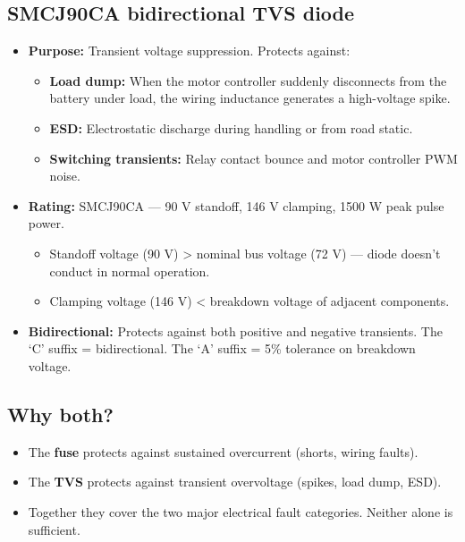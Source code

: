\documentclass[12pt,a4paper,oneside]{report}
\providecommand{\tightlist}{\setlength{\itemsep}{0pt}\setlength{\parskip}{0pt}}
\begin{document}
\subsection{SMCJ90CA bidirectional TVS
diode}\label{smcj90ca-bidirectional-tvs-diode}

\begin{itemize}
\tightlist
\item
  \textbf{Purpose:} Transient voltage suppression. Protects against:

  \begin{itemize}
  \tightlist
  \item
    \textbf{Load dump:} When the motor controller suddenly disconnects from the
    battery under load, the wiring inductance generates a high-voltage spike.
  \item
    \textbf{ESD:} Electrostatic discharge during handling or from road static.
  \item
    \textbf{Switching transients:} Relay contact bounce and motor controller PWM
    noise.
  \end{itemize}
\item
  \textbf{Rating:} SMCJ90CA --- 90 V standoff, 146 V clamping, 1500 W peak pulse
  power.

  \begin{itemize}
  \tightlist
  \item
    Standoff voltage (90 V) \textgreater{} nominal bus voltage (72 V) --- diode
    doesn't conduct in normal operation.
  \item
    Clamping voltage (146 V) \textless{} breakdown voltage of adjacent
    components.
  \end{itemize}
\item
  \textbf{Bidirectional:} Protects against both positive and negative
  transients. The `C' suffix = bidirectional. The `A' suffix = 5\% tolerance on
  breakdown voltage.
\end{itemize}

\subsection{Why both?}\label{why-both}

\begin{itemize}
\tightlist
\item
  The \textbf{fuse} protects against sustained overcurrent (shorts, wiring
  faults).
\item
  The \textbf{TVS} protects against transient overvoltage (spikes, load dump,
  ESD).
\item
  Together they cover the two major electrical fault categories. Neither alone
  is sufficient.
\end{itemize}
\end{document}
